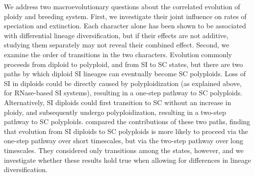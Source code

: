 We address two macroevolutionary questions about the correlated evolution of ploidy and breeding system.
First, we investigate their joint influence on rates of speciation and extinction.
Each character alone has been shown to be associated with differential lineage diversification, but if their effects are not additive, studying them separately may not reveal their combined effect.
Second, we examine the order of transitions in the two characters.
Evolution commonly proceeds from diploid to polyploid, and from SI to SC states, but there are two paths by which diploid SI lineages can eventually become SC polyploids.
Loss of SI in diploids could be directly caused by polyploidization (as explained above, for RNase-based SI systems), resulting in a one-step pathway to SC polyploids. 
Alternatively, SI diploids could first transition to SC without an increase in ploidy, and subsequently undergo polyploidization, resulting in a two-step pathway to SC polyploids.
\citet{robertson_2011} compared the contributions of these two paths, finding that evolution from SI diploids to SC polyploids is more likely to proceed via the one-step pathway over short timescales, but via the two-step pathway over long timescales.
They considered only transitions among the states, however, and we investigate whether these results hold true when allowing for differences in lineage diversification.


